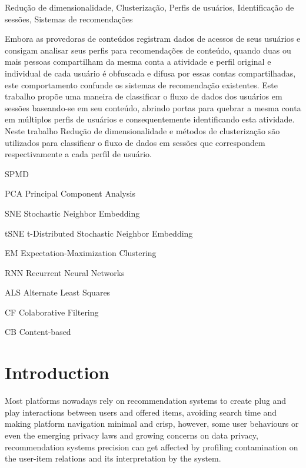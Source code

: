 \documentclass[ecp,tc,english]{iiufrgs}
\begin{document}
\begin{englishabstract}{}{Redução de dimensionalidade, Clusterização, Perfis de usuários, Identificação de sessões, Sistemas de recomendações}

  Embora as provedoras de conteúdos registram dados de acessos de seus usuários e consigam analisar seus perfis para recomendações de conteúdo, quando duas ou mais pessoas compartilham da mesma conta a atividade e perfil original e individual de cada usuário é obfuscada e difusa por essas contas compartilhadas, este comportamento confunde os sistemas de recomendação existentes. 
  Este trabalho propõe uma maneira de classificar o fluxo de dados dos usuários em sessões baseando-se em seu conteúdo, abrindo portas para quebrar a mesma conta em múltiplos perfis de usuários e consequentemente identificando esta atividade. Neste trabalho Redução de dimensionalidade e métodos de clusterização são utilizados para classificar o fluxo de dados em sessões que correspondem respectivamente a cada perfil de usuário.
\end{englishabstract}

\listoffigures 
\listoftables 

\begin{listofabbrv}{SPMD}
    \item[PCA] Principal Component Analysis
    \item[SNE] Stochastic Neighbor Embedding
    \item[tSNE] t-Distributed Stochastic Neighbor Embedding
    \item[EM] Expectation-Maximization Clustering
    \item[RNN] Recurrent Neural Networks
    \item[ALS] Alternate Least Squares    
    \item[CF] Colaborative Filtering
    \item[CB] Content-based
\end{listofabbrv}

\tableofcontents %


\chapter{Introduction}
Most platforms nowadays rely on recommendation systems to create plug and play interactions between users and offered items, avoiding search time and making platform navigation minimal and crisp, however, some user behaviours or even the emerging privacy laws and growing concerns on data privacy, recommendation systems precision can get affected by profiling contamination on the user-item relations  and its interpretation by the system.
\end{document}
